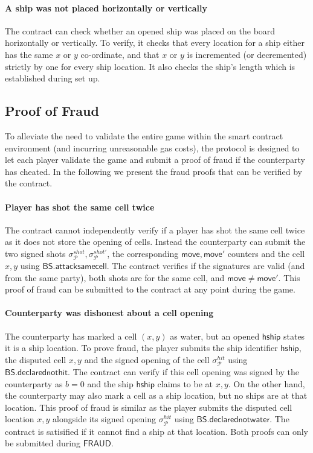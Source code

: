 \documentclass{llncs}
\newcommand{\gamefraud}{\mathsf{FRAUD}}
\newcommand{\hship}{\mathsf{hship}}
\newcommand{\participant}{\mathcal{P}}
\newcommand{\battleshipdeclarednothit}{\mathsf{BS.declarednothit}}
\newcommand{\battleshipdeclarednotwater}{\mathsf{BS.declarednotwater}}
\newcommand{\battleshipsamecell}{\mathsf{BS.attacksamecell}}
\begin{document}
	\paragraph{A ship was not placed  horizontally or vertically}\label{sec:vertical}
	The contract can check whether an opened ship was placed on the board horizontally or vertically. 
	To verify, it checks that every location for a ship either has the same $x$ or $y$ co-ordinate, and that $x$ or $y$ is incremented (or decremented) strictly by one for every ship location. 
	It also checks the ship's length which is established during set up. 
	
	\subsection{Proof of Fraud}  \label{sec:prooffraud}
	
	To alleviate the need to validate the entire game within the smart contract environment (and incurring unreasonable gas costs), the protocol is designed to let each player validate the game and submit a proof of fraud if the counterparty has cheated. 
	In the following we present the fraud proofs that can be verified by the contract. 
	
	\paragraph{Player has shot the same cell twice} 
	The contract cannot independently verify if a player has shot the same cell twice as it does not store the opening of cells.
	Instead the counterparty can submit the two signed shots $\sigma^{shot}_{\participant},\sigma^{shot'}_{\participant}$, the corresponding $\mathsf{move},\mathsf{move}'$ counters and the cell $x,y$ using $\battleshipsamecell$. 
	The contract verifies if the signatures are valid (and from the same party), both shots are for the same cell, and $\mathsf{move}\neq\mathsf{move}'$. 
	This proof of fraud can be submitted to the contract at any point during the game. 
	
	\paragraph{Counterparty was dishonest about a cell opening}
	The counterparty has marked a cell $(x,y)$ as water, but an opened $\hship$ states it is a ship location. 
	To prove fraud, the player submits the ship identifier $\hship$, the disputed cell $x,y$ and the signed opening of the cell $\sigma^{hit}_{\participant}$ using $\battleshipdeclarednothit$.
	The contract can verify if this cell opening was signed by the counterparty as $b = 0$ and the ship $\hship$ claims to be at $x,y$.   
	On the other hand, the counterparty may also mark a cell as a ship location,  but no ships are at that location.
	This proof of fraud is similar as the player submits the disputed cell location $x,y$ alongside its signed opening $\sigma^{hit}_{\participant}$ using $\battleshipdeclarednotwater$. 
	The contract is satisified if it cannot find a ship at that location. 
	Both proofs can only be submitted during $\gamefraud$. 
	
\end{document}
